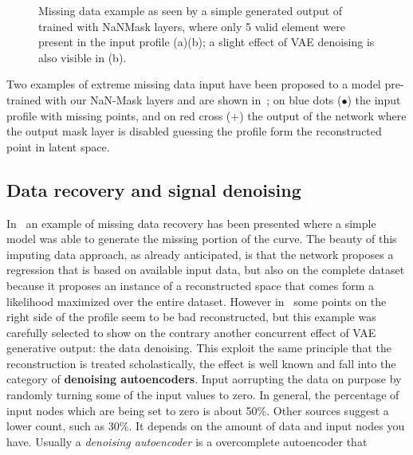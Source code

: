 \begin{figure}
    \centering
    \caption{Missing data example as seen by a simple generated output of  trained with NaNMask layers, where only 5 valid element were present in the input profile (a)(b); a slight effect of VAE denoising is also visible in (b). }
    \label{fig:missing data example}
\end{figure}
Two examples of extreme missing data input have been proposed to a  model pre-trained with our NaN-Mask layers and are shown in~\Figure{\ref{fig:missing data example}}; on blue dots ($\bullet$) the input profile with missing points, and on red cross (+) the output of the network where the output mask layer is disabled guessing the profile form the reconstructed point in latent space.

\subsection{Data recovery and signal denoising}
In~\Figure{\ref{fig:missing data example}} an example of missing data recovery has been presented where a simple  model was able to generate the missing portion of the curve. The beauty of this imputing data approach, as already anticipated, is that the network proposes a regression that is based on available input data, but also on the complete dataset because it proposes an instance of a reconstructed space that comes form a likelihood maximized over the entire dataset.
However in~\Figure{\ref{fig:missing data example_b}} some points on the right side of the profile seem to be bad reconstructed, but this example was carefully selected to show on the contrary another concurrent effect of \acs{VAE} generative output: the data denoising.
This exploit the same principle that the reconstruction is treated scholastically, the effect is well known and fall into the category of \textbf{denoising autoencoders}.
Input aorrupting the data on purpose by randomly turning some of the input values to zero. In general, the percentage of input nodes which are being set to zero is about 50\%. Other sources suggest a lower count, such as 30\%. It depends on the amount of data and input nodes you have.
Usually a \textit{denoising autoencoder} is a overcomplete autoencoder that 


